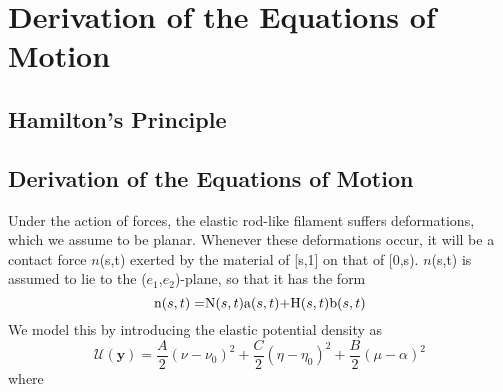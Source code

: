 \documentclass[12pt]{article}
\newcommand{\cB}{B}
\newcommand{\cA}{A}
\newcommand{\cC}{C}
\begin{document}
\section{Derivation of the Equations of Motion
}\label{Derivation of the Equations of Motion
}
\subsection{Hamilton's Principle}
\subsection{Derivation of the Equations of Motion}
Under the action of forces, the elastic rod-like filament suffers deformations, which we assume to be planar. Whenever these deformations occur, it will be a contact force $n$(s,t) exerted by the material of [s,1] on that of [0,s). $n$(s,t) is assumed to lie to the ($e_1$,$e_2$)-plane, so that it has the form
\[  $n$(s,t)=$N$(s,t)$a$(s,t) + $H$(s,t)$b$(s,t)
\]
We model this by introducing the elastic potential density as
\[ \mathcal{U}(\textbf {y}) = \frac{\cA}{2} (\nu - \nu_0)^2
+\frac{\cC}{2} (\eta - \eta_0 )^2
+\frac{\cB}{2} (\mu -\alpha)^2 
\]
where
\end{document}
